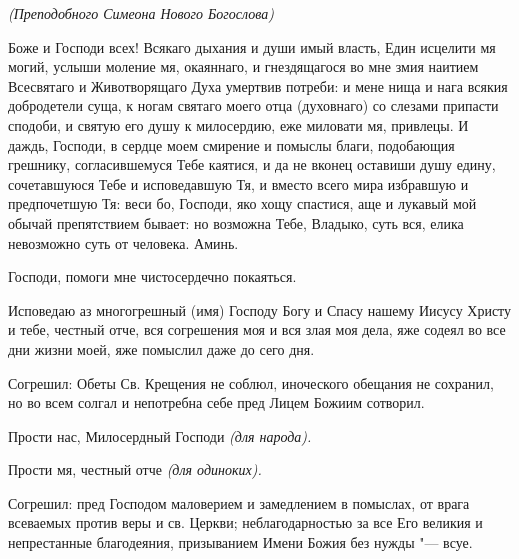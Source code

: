 \mychapterending

 


\itshape (Преподобного Симеона Нового Богослова) 

\normalfont{}

Боже и Господи всех! Всякаго дыхания и души имый власть, Един исцелити мя могий, услыши моление мя, окаяннаго, и гнездящагося во мне змия наитием Всесвятаго и Животворящаго Духа умертвив потреби: и мене нища и нага всякия добродетели суща, к ногам святаго моего отца (духовнаго) со слезами припасти сподоби, и святую его душу к милосердию, еже миловати мя, привлецы. И даждь, Господи, в сердце моем смирение и помыслы благи, подобающия грешнику, согласившемуся Тебе каятися, и да не вконец оставиши душу едину, сочетавшуюся Тебе и исповедавшую Тя, и вместо всего мира избравшую и предпочетшую Тя: веси бо, Господи, яко хощу спастися, аще и лукавый мой обычай препятствием бывает: но возможна Тебе, Владыко, суть вся, елика невозможно суть от человека. Аминь. 
\mychapterending

 


Господи, помоги мне чистосердечно покаяться. 
\mychapterending

 
Исповедаю аз многогрешный (имя) Господу Богу и Спасу нашему Иисусу Христу и тебе, честный отче, вся согрешения моя и вся злая моя дела, яже содеял во все дни жизни моей, яже помыслил даже до сего дня. 



Согрешил: Обеты Св. Крещения не соблюл, иноческого обещания не сохранил, но во всем солгал и непотребна себе пред Лицем Божиим сотворил. 



Прости нас, Милосердный Господи \itshape (для народа).

\normalfont{}Прости мя, честный отче \itshape (для одиноких).\normalfont{} 



Согрешил: пред Господом маловерием и замедлением в помыслах, от врага всеваемых против веры и св. Церкви; неблагодарностью за все Его великия и непрестанные благодеяния, призыванием Имени Божия без нужды "--- всуе. 



